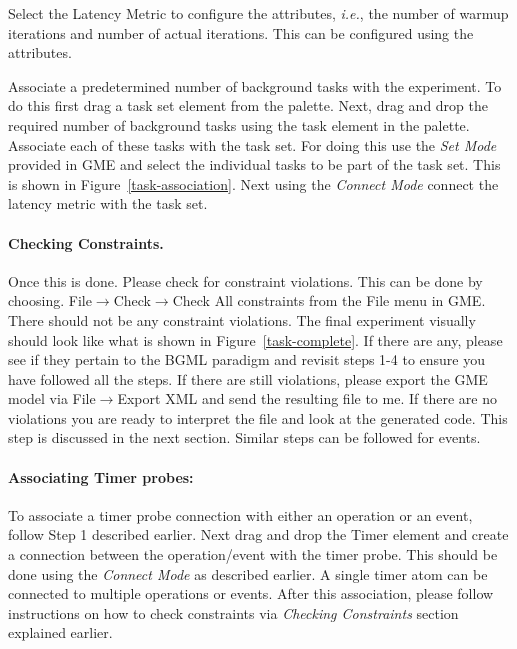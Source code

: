 \documentclass[onecolumn]{article}
\begin{document}
\smallskip
{} Select the Latency Metric to configure the
attributes, {\em i.e.}, the number of warmup iterations and number of
actual iterations. This can be configured using the attributes.

\smallskip
{} Associate a predetermined number of background tasks
with the experiment. To do this first drag a task set element from the
palette. Next, drag and drop the required number of background tasks
using the task element in the palette. Associate each of these tasks
with the task set. For doing this use the {\em Set Mode} provided in
GME and select the individual tasks to be part of the task set. This
is shown in Figure~\ref{task-association}. Next using the {\em Connect Mode}
connect the latency metric with the task set.

\paragraph* {\bf Checking Constraints.}
Once this is done. Please check for constraint violations. This can be
done by choosing. File$\rightarrow$Check$\rightarrow$Check All
constraints from the File menu in GME. There should not be any
constraint violations. The final experiment visually should look like
what is shown in Figure~\ref{task-complete}. If there are any, please
see if they pertain to the BGML paradigm and revisit steps 1-4 to
ensure you have followed all the steps. If there are still violations,
please export the GME model via File$\rightarrow$Export XML and send the
resulting file to me. If there are no
violations you are ready to interpret the file and look at the
generated code. This step is discussed in the next section. Similar
steps can be followed for events.

\paragraph* {\bf Associating Timer probes:}
To associate a timer probe connection with either an operation or an
event, follow Step 1 described earlier. Next drag and drop the Timer
element and create a connection between the operation/event with the
timer probe. This should be done using the {\em Connect Mode} as
described earlier.  A single timer atom can be connected to multiple
operations or events. After this association, please follow
instructions on how to check constraints via {\em Checking
Constraints} section explained earlier.
\end{document}
